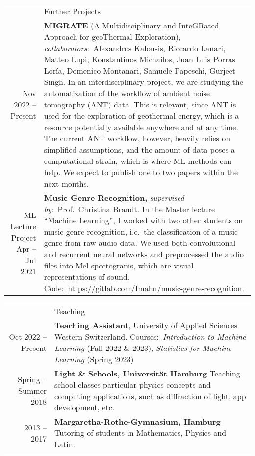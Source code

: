 \documentclass[11pt, a4paper]{article}
\newcommand{\headingfont}{\Large\color{OliveGreen}}
\newenvironment{SectionTable}[1]{
	\renewcommand*{\arraystretch}{1.7}
	\setlength{\tabcolsep}{10pt}
	\begin{longtable}{Rp{5.2in}} & #1 \\}
	{\end{longtable}\vspace{-.3cm}}
\begin{document}
	\begin{SectionTable}{\headingfont Further Projects}
		Nov 2022 -- Present & \textbf{MIGRATE} (A Multidisciplinary and InteGRated Approach for geoThermal Exploration), \textit{collaborators}:~Alexandros Kalousis, Riccardo Lanari, Matteo Lupi, Konstantinos Michailos,
        Juan Luis Porras Loría, Domenico Montanari, Samuele Papeschi, Gurjeet Singh. In an interdisciplinary project, we are studying the automatization of the workflow of ambient noise tomography (ANT) data. 
        This is relevant, since ANT is used for the exploration of geothermal energy, which is a resource potentially available anywhere and at any time. The current ANT workflow, however, heavily relies on 
        simplified assumptions, and the amount of data poses a computational strain, which is where ML methods can help. We expect to publish one to two papers within 
		the next months.\\
        
        ML Lecture Project Apr -- Jul 2021 & \textbf{Music Genre Recognition,} \textit{supervised by}:~Prof.~Christina Brandt. In the Master lecture \enquote{Machine Learning}, I worked with two other 
        students on music genre recognition, i.e.~the classification of a music genre from raw audio data. We used both convolutional and recurrent neural networks and preprocessed the audio files into 
        Mel spectograms, which are visual representations of sound. Code:~\url{https://gitlab.com/Imahn/music-genre-recognition}.
		
	\end{SectionTable}

	\begin{SectionTable}{\headingfont Teaching}
		Oct 2022 -- Present & \textbf{Teaching Assistant}, University of Applied Sciences Western Switzerland. \newline Courses:~\textit{Introduction to Machine Learning} (Fall 2022 \& 2023), \textit{Statistics for Machine Learning} (Spring 2023) \\
		
		Spring -- Summer 2018 & 
		\textbf{Light \& Schools, Universität Hamburg} \newline
		Teaching school classes particular physics concepts and computing applications, such as diffraction of light, app development, etc.\\ 
		
		2013 -- 2017 & \textbf{Margaretha-Rothe-Gymnasium, Hamburg} \newline 
		Tutoring of students in Mathematics, Physics and Latin. 
	\end{SectionTable}
    
\end{document}
